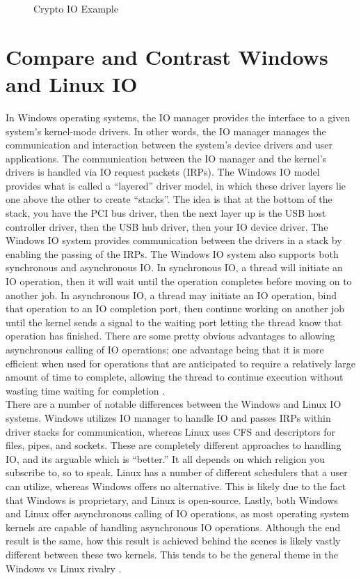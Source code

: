 \documentclass[letterpaper,10pt,draftclsnofoot,onecolumn]{IEEEtran}
\begin{document}
\begin{figure}[H]
    \centering
    
    \caption{Crypto IO Example}
    \label{fig:crypto_io_ex}
\end{figure}

\section{Compare and Contrast Windows and Linux IO}
\noindent In Windows operating systems, the IO manager provides the interface to a given system’s kernel-mode drivers. In other words, the IO manager manages the communication and interaction between the system’s device drivers and user applications. The communication between the IO manager and the kernel’s drivers is handled via IO request packets (IRPs). The Windows IO model provides what is called a “layered” driver model, in which these driver layers lie one above the other to create “stacks”. The idea is that at the bottom of the stack, you have the PCI bus driver, then the next layer up is the USB host controller driver, then the USB hub driver, then your IO device driver. The Windows IO system provides communication between the drivers in a stack by enabling the passing of the IRPs. The Windows IO system also supports both synchronous and asynchronous IO. In synchronous IO, a thread will initiate an IO operation, then it will wait until the operation completes before moving on to another job. In asynchronous IO, a thread may initiate an IO operation, bind that operation to an IO completion port, then continue working on another job until the kernel sends a signal to the waiting port letting the thread know that operation has finished. There are some pretty obvious advantages to allowing asynchronous calling of IO operations; one advantage being that it is more efficient when used for operations that are anticipated to require a relatively large amount of time to complete, allowing the thread to continue execution without wasting time waiting for completion \cite{MSWindows1IO} \cite{MSWindows2IO} \cite{MSWindows3IO} \cite{MSWindows4IO}.\\

\noindent There are a number of notable differences between the Windows and Linux IO systems. Windows utilizes IO manager to handle IO and passes IRPs within driver stacks for communication, whereas Linux uses CFS and descriptors for files, pipes, and sockets. These are completely different approaches to handling IO, and its arguable which is “better.” It all depends on which religion you subscribe to, so to speak. Linux has a number of different schedulers that a user can utilize, whereas Windows offers no alternative. This is likely due to the fact that Windows is proprietary, and Linux is open-source. Lastly, both Windows and Linux offer asynchronous calling of IO operations, as most operating system kernels are capable of handling asynchronous IO operations. Although the end result is the same, how this result is achieved behind the scenes is likely vastly different between these two kernels. This tends to be the general theme in the Windows vs Linux rivalry \cite{Linux1IO} \cite{Linux2IO}.\\
\end{document}
